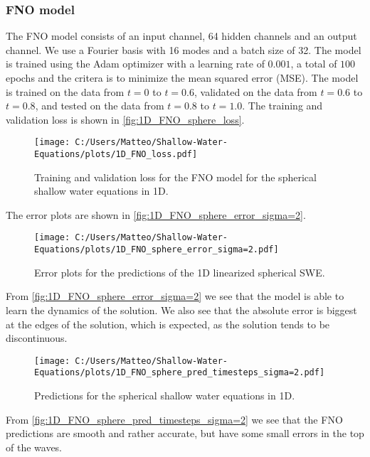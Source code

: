 \subsubsection*{FNO model}
The FNO model consists of an input channel, 64 hidden channels and an output channel. We use a Fourier basis with 16 modes and a batch size of 32.
The model is trained using the Adam optimizer with a learning rate of $0.001$, a total of $100$ epochs and the critera is to minimize the mean squared error (MSE).
The model is trained on the data from $t = 0$ to $t = 0.6$, validated on the data from $t = 0.6$ to $t = 0.8$, and tested on the data from $t = 0.8$ to $t = 1.0$.
The training and validation loss is shown in \autoref{fig:1D_FNO_sphere_loss}.
\begin{figure}[H]
    \centering
    \texttt{[image: C:/Users/Matteo/Shallow-Water-Equations/plots/1D\_FNO\_loss.pdf]}
    \caption{Training and validation loss for the FNO model for the spherical shallow water equations in 1D.}\label{fig:1D_FNO_sphere_loss}
\end{figure}
The error plots are shown in \autoref{fig:1D_FNO_sphere_error_sigma=2}.
\begin{figure}[H]
    \centering
    \texttt{[image: C:/Users/Matteo/Shallow-Water-Equations/plots/1D\_FNO\_sphere\_error\_sigma=2.pdf]}
    \caption{Error plots for the predictions of the 1D linearized spherical SWE.}\label{fig:1D_FNO_sphere_error_sigma=2}
\end{figure}
From \autoref{fig:1D_FNO_sphere_error_sigma=2} we see that the model is able to learn the dynamics of the solution.
We also see that the absolute error is biggest at the edges of the solution, which is expected, as the solution tends to be discontinuous.

\begin{figure}[H]
    \centering
    \texttt{[image: C:/Users/Matteo/Shallow-Water-Equations/plots/1D\_FNO\_sphere\_pred\_timesteps\_sigma=2.pdf]}
    \caption{Predictions for the spherical shallow water equations in 1D.}\label{fig:1D_FNO_sphere_pred_timesteps_sigma=2}
\end{figure}
From \autoref{fig:1D_FNO_sphere_pred_timesteps_sigma=2} we see that the FNO predictions are smooth and rather accurate, but have some small errors in the top of the waves.


